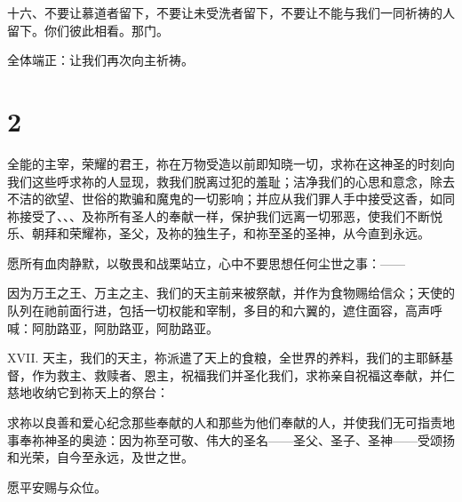 十六、不要让慕道者留下，不要让未受洗者留下，不要让不能与我们一同祈祷的人留下。你们彼此相看。那门。\par

全体端正：让我们再次向主祈祷。\par


\section{2}

\par

全能的主宰，荣耀的君王，祢在万物受造以前即知晓一切，求祢在这神圣的时刻向我们这些呼求祢的人显现，救我们脱离过犯的羞耻；洁净我们的心思和意念，除去不洁的欲望、世俗的欺骗和魔鬼的一切影响；并应从我们罪人手中接受这香，如同祢接受了、、、及祢所有圣人的奉献一样，保护我们远离一切邪恶，使我们不断悦乐、朝拜和荣耀祢，圣父，及祢的独生子，和祢至圣的圣神，从今直到永远。\par

\par

愿所有血肉静默，以敬畏和战栗站立，心中不要思想任何尘世之事：——\par

因为万王之王、万主之主、我们的天主前来被祭献，并作为食物赐给信众；天使的队列在祂前面行进，包括一切权能和宰制，多目的和六翼的，遮住面容，高声呼喊：阿肋路亚，阿肋路亚，阿肋路亚。\par

\par

XVII. 天主，我们的天主，祢派遣了天上的食粮，全世界的养料，我们的主耶稣基督，作为救主、救赎者、恩主，祝福我们并圣化我们，求祢亲自祝福这奉献，并仁慈地收纳它到祢天上的祭台：\par

求祢以良善和爱心纪念那些奉献的人和那些为他们奉献的人，并使我们无可指责地事奉祢神圣的奥迹：因为祢至可敬、伟大的圣名——圣父、圣子、圣神——受颂扬和光荣，自今至永远，及世之世。\par

\par

愿平安赐与众位。\par

